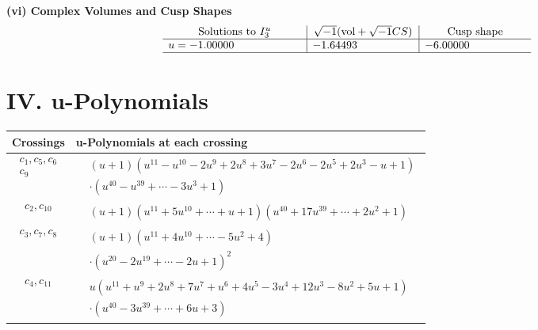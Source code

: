 \documentclass[1p]{elsarticle_modified}
\theoremstyle{definition}
\newcommand{\I}{\sqrt{-1}}
\begin{document}
\newpage\flushleft \textbf{(vi) Complex Volumes and Cusp Shapes}
$$\begin{array}{c|c|c}  
\text{Solutions to }I^u_{3}& \I (\text{vol} + \sqrt{-1}CS) & \text{Cusp shape}\\
 \hline 
\begin{aligned}
u &= -1.00000\phantom{ +0.000000I}\end{aligned}
 & -1.64493\phantom{ +0.000000I} & -6.00000\phantom{ +0.000000I}\\
 \hline 
 \end{array}$$\newpage
\newpage\renewcommand{\arraystretch}{1}
\centering \section*{ IV. u-Polynomials}
\begin{tabular}{m{50pt}|m{274pt}}
Crossings & \hspace{64pt}u-Polynomials at each crossing \\
\hline $$\begin{aligned}c_{1},c_{5},c_{6}\\c_{9}\end{aligned}$$&$\begin{aligned}
&(u+1)(u^{11}- u^{10}-2 u^9+2 u^8+3 u^7-2 u^6-2 u^5+2 u^3- u+1)\\
&\cdot(u^{40}- u^{39}+\cdots-3 u^3+1)
\end{aligned}$\\
\hline $$\begin{aligned}c_{2},c_{10}\end{aligned}$$&$\begin{aligned}
&(u+1)(u^{11}+5 u^{10}+\cdots+u+1)(u^{40}+17 u^{39}+\cdots+2 u^2+1)
\end{aligned}$\\
\hline $$\begin{aligned}c_{3},c_{7},c_{8}\end{aligned}$$&$\begin{aligned}
&(u+1)(u^{11}+4 u^{10}+\cdots-5 u^2+4)\\
&\cdot(u^{20}-2 u^{19}+\cdots-2 u+1)^{2}
\end{aligned}$\\
\hline $$\begin{aligned}c_{4},c_{11}\end{aligned}$$&$\begin{aligned}
&u(u^{11}+u^9+2 u^8+7 u^7+u^6+4 u^5-3 u^4+12 u^3-8 u^2+5 u+1)\\
&\cdot(u^{40}-3 u^{39}+\cdots+6 u+3)
\end{aligned}$\\
\hline
\end{tabular}\newpage\renewcommand{\arraystretch}{1}
\end{document}

